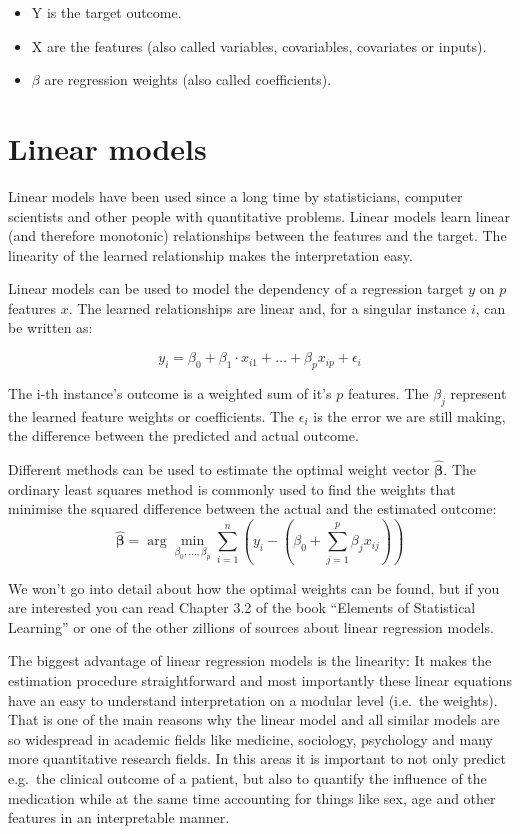 \documentclass[12pt,]{krantz}
\providecommand{\tightlist}{%
  \setlength{\itemsep}{0pt}\setlength{\parskip}{0pt}}
\theoremstyle{definition}
\theoremstyle{definition}
\theoremstyle{definition}
\theoremstyle{remark}
\begin{document}
\begin{itemize}
\tightlist
\item
  Y is the target outcome.
\item
  X are the features (also called variables, covariables, covariates or
  inputs).
\item
  \(\beta\) are regression weights (also called coefficients).
\end{itemize}

\section{Linear models}\label{limo}

Linear models have been used since a long time by statisticians,
computer scientists and other people with quantitative problems. Linear
models learn linear (and therefore monotonic) relationships between the
features and the target. The linearity of the learned relationship makes
the interpretation easy.

Linear models can be used to model the dependency of a regression target
\(y\) on \(p\) features \(x\). The learned relationships are linear and,
for a singular instance \(i\), can be written as:

\[y_{i} = \beta_{0} + \beta_{1} \cdot x_{i1} + \ldots + \beta_{p} x_{ip} + \epsilon_{i}\]

The i-th instance's outcome is a weighted sum of it's \(p\) features.
The \(\beta_{j}\) represent the learned feature weights or coefficients.
The \(\epsilon_{i}\) is the error we are still making, the difference
between the predicted and actual outcome.

Different methods can be used to estimate the optimal weight vector
\(\mathbf{\hat{\beta}}\). The ordinary least squares method is commonly
used to find the weights that minimise the squared difference between
the actual and the estimated outcome:
\[\mathbf{\hat{\beta}} = \arg\!\min_{\beta_0, \ldots, \beta_p} \sum_{i=1}^n \left(y_i - \left(\beta_0 + \sum_{j=1}^p \beta_j x_{ij}\right)\right)\]

We won't go into detail about how the optimal weights can be found, but
if you are interested you can read Chapter 3.2 of the book ``Elements of
Statistical Learning'' \citep{Hastie2009} or one of the other zillions
of sources about linear regression models.

The biggest advantage of linear regression models is the linearity: It
makes the estimation procedure straightforward and most importantly
these linear equations have an easy to understand interpretation on a
modular level (i.e.~the weights). That is one of the main reasons why
the linear model and all similar models are so widespread in academic
fields like medicine, sociology, psychology and many more quantitative
research fields. In this areas it is important to not only predict
e.g.~the clinical outcome of a patient, but also to quantify the
influence of the medication while at the same time accounting for things
like sex, age and other features in an interpretable manner.
\end{document}
